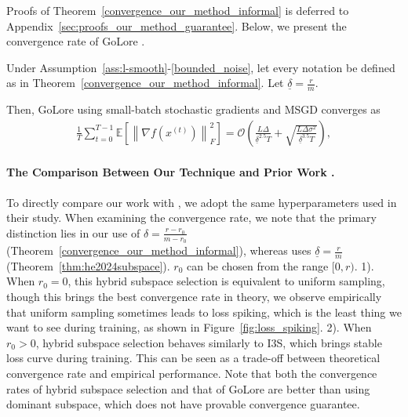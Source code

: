 Proofs of Theorem~\ref{convergence_our_method_informal} is deferred to Appendix~\ref{sec:proofs_our_method_guarantee}. Below, we present the convergence rate of GoLore \cite{he2024subspace}.

\begin{theorem}\label{thm:he2024subspace}
    Under Assumption~\ref{ass:l-smooth}-\ref{bounded_noise}, let every notation be defined as in Theorem~\ref{convergence_our_method_informal}. Let $\underline{\delta}=\frac{r}{m}$. 
    
    Then, GoLore using small-batch stochastic gradients and MSGD converges as
    \begin{align*}
\frac{1}{T}\sum_{t=0}^{T-1}\mathbb{E}\left[\left\|\nabla f(x^{(t)}) \right\|_F^2\right]=\mathcal{O}\left(\frac{L\Delta}{\underline{\delta}^{2.5}T}+\sqrt{\frac{L\Delta\sigma^2}{\underline{\delta}^{3.5}T}}\right),   
\end{align*}
\end{theorem}

\paragraph{The Comparison Between Our Technique and Prior Work \cite{he2024subspace}.}

To directly compare our work with \cite{he2024subspace}, we adopt the same hyperparameters used in their study. When examining the convergence rate, we note that the primary distinction lies in our use of $\delta=\frac{r-r_0}{m-r_0}$ (Theorem~\ref{convergence_our_method_informal}), whereas \cite{he2024subspace} uses $\underline{\delta}=\frac{r}{m}$ (Theorem~\ref{thm:he2024subspace}).
$r_0$ can be chosen from the range $[0, r)$. 1). When $r_0=0$, this hybrid subspace selection is equivalent to uniform sampling, though this brings the best convergence rate in theory, we observe empirically that uniform sampling sometimes leads to loss spiking, which is the least thing we want to see during training, as shown in Figure~\ref{fig:loss_spiking}. 2). When $r_0>0$, hybrid subspace selection behaves similarly to I3S, which brings stable loss curve during training. This can be seen as a trade-off between theoretical convergence rate and empirical performance. Note that both the convergence rates of hybrid subspace selection and that of GoLore are better than using dominant subspace, which does not have provable convergence guarantee. 






